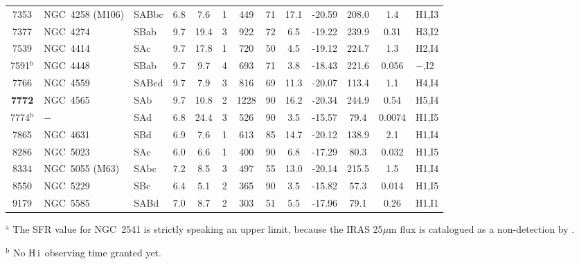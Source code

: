 \documentclass[oldversion]{aa}
\newcommand{\HI}{{\sc H\,i}}
\begin{document}
\begin{table}
\begin{tabular}{cllcccccccccl}
7353              & NGC~4258 (M106) & SABbc & 6.8  &  7.6 & 1 & 449  & 71 & 17.1 & -20.59 & 208.0 & 1.4                & H1,I3\\
7377              & NGC~4274        & SBab  & 9.7  & 19.4 & 3 & 922  & 72 & 6.5  & -19.22 & 239.9 & 0.31               & H3,I2\\
7539              & NGC~4414        & SAc   & 9.7  & 17.8 & 1 & 720  & 50 & 4.5  & -19.12 & 224.7 & 1.3                & H2,I4\\
7591$^\mathrm{b}$ & NGC~4448        & SBab  & 9.7  &  9.7 & 4 & 693  & 71 & 3.8  & -18.43 & 221.6 & 0.056              & $-$,I2\\
7766              & NGC~4559        & SABcd & 9.7  &  7.9 & 3 & 816  & 69 & 11.3 & -20.07 & 113.4 & 1.1                & H4,I4\\
{\bf 7772}        & NGC~4565        & SAb   & 9.7  & 10.8 & 2 & 1228 & 90 & 16.2 & -20.34 & 244.9 & 0.54               & H5,I4\\
7774$^\mathrm{b}$ & $-$             & SAd   & 6.8  & 24.4 & 3 & 526  & 90 & 3.5  & -15.57 & 79.4  & 0.0074             & H1,I5\\
7865              & NGC~4631        & SBd   & 6.9  &  7.6 & 1 & 613  & 85 & 14.7 & -20.12 & 138.9 & 2.1                & H1,I4\\
8286              & NGC~5023        & SAc   & 6.0  &  6.6 & 1 & 400  & 90 & 6.8  & -17.29 & 80.3  & 0.032              & H1,I5\\
8334              & NGC~5055 (M63)  & SAbc  & 7.2  &  8.5 & 3 & 497  & 55 & 13.0 & -20.14 & 215.5 & 1.5                & H1,I4\\
8550              & NGC~5229        & SBc   & 6.4  &  5.1 & 2 & 365  & 90 & 3.5  & -15.82 & 57.3  & 0.014              & H1,I5\\
9179              & NGC~5585        & SABd  & 7.0  &  8.7 & 2 & 303  & 51 & 5.5  & -17.96 & 79.1  & 0.26               & H1,I1\\
\hline
\end{tabular}
\begin{list}{}{}
\item[$^{\mathrm{a}}$] The SFR value for NGC~2541 is strictly speaking an upper limit, because the IRAS 25$\mu$m flux is catalogued as a non-detection by \citet{moshir_etal_1990}.
\item[$^{\mathrm{b}}$] No \HI\ observing time granted yet.
\end{list}
\end{table}
\end{document}
